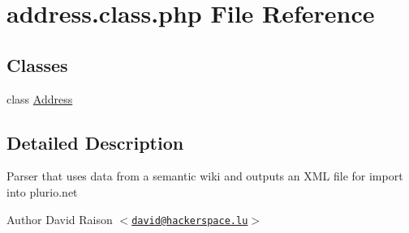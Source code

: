 \hypertarget{address_8class_8php}{
\section{address.class.php File Reference}
\label{address_8class_8php}
}
\subsection*{Classes}
\begin{DoxyCompactItemize}
\item 
class \hyperlink{classAddress}{Address}
\end{DoxyCompactItemize}


\subsection{Detailed Description}
Parser that uses data from a semantic wiki and outputs an XML file for import into plurio.net

\begin{DoxyAuthor}{Author}
David Raison $<$\href{mailto:david@hackerspace.lu}{\tt david@hackerspace.lu}$>$ 
\end{DoxyAuthor}
